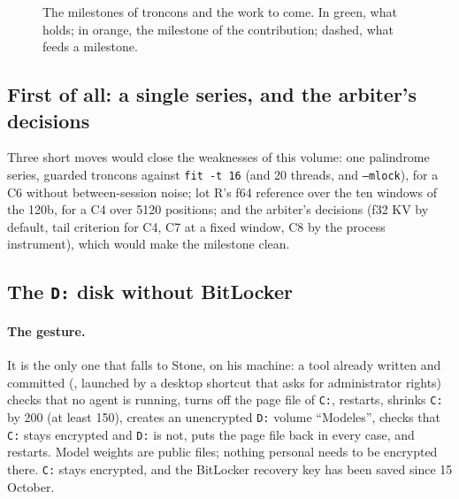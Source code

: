 \begin{figure}[ht]
\centering
\SchemaResJalons
\caption[The milestones and the work to come]{The milestones of troncons and the work to come. In green, what holds; in orange, the milestone of the contribution; dashed, what feeds a milestone.}
\label{t2d-fig:jalons}
\end{figure}

\subsection{First of all: a single series, and the arbiter's decisions}

Three short moves would close the weaknesses of this volume: one palindrome series, guarded troncons against \texttt{fit -t 16} (and 20 threads, and \texttt{--mlock}), for a C6 without between-session noise; lot R's f64 reference over the ten windows of the 120b, for a C4 over \num{5120} positions; and the arbiter's decisions (f32 KV by default, tail criterion for C4, C7 at a fixed window, C8 by the process instrument), which would make the milestone clean.

\subsection{The \texttt{D:} disk without BitLocker}\label{t2d-sec:disque}

\paragraph{The gesture.} It is the only one that falls to Stone, on his machine: a tool already written and committed (, launched by a desktop shortcut that asks for administrator rights) checks that no agent is running, turns off the page file of \texttt{C:}, restarts, shrinks \texttt{C:} by \SI{200}{\Go} (at least 150), creates an unencrypted \texttt{D:} volume ``Modeles'', checks that \texttt{C:} stays encrypted and \texttt{D:} is not, puts the page file back in every case, and restarts. Model weights are public files; nothing personal needs to be encrypted there. \texttt{C:} stays encrypted, and the BitLocker recovery key has been saved since 15 October.

